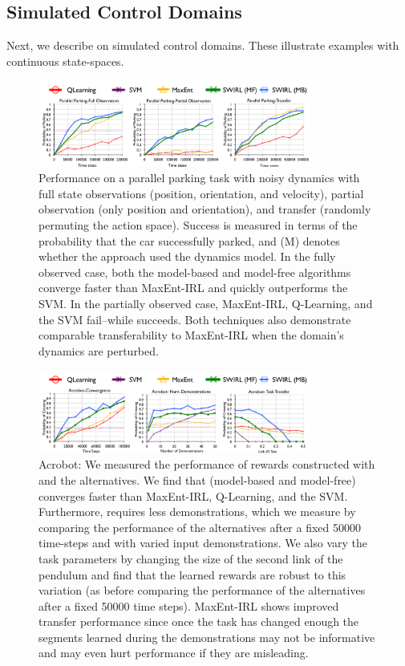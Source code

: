 \subsection{Simulated Control Domains}
Next, we describe \hirl on simulated control domains. These illustrate examples with continuous state-spaces.







\begin{figure}[t]
\centering
 \includegraphics[width=0.8\textwidth]{exp/rc-convergence-1.png}
 \caption{Performance on a parallel parking task with noisy dynamics with full state observations (position, orientation, and velocity), partial observation (only position and orientation), and transfer (randomly permuting the action space).
 Success is measured in terms of the probability that the car successfully parked, and (M) denotes whether the approach used the dynamics model.
 In the fully observed case, both the model-based and model-free \hirl algorithms converge faster than MaxEnt-IRL and quickly outperforms the SVM.
 In the partially observed case, MaxEnt-IRL, Q-Learning, and the SVM fail--while \hirl succeeds.
 Both techniques also demonstrate comparable transferability to MaxEnt-IRL when the domain's dynamics are perturbed.
\label{exp:rcsegmentation-res}}
\end{figure}



\begin{figure}[t]
\centering
 \includegraphics[width=0.8\textwidth]{exp/acr-convergence-1.png}
 \caption{Acrobot: We measured the performance of rewards constructed with \hirl and the alternatives. We find that \hirl (model-based and model-free) converges faster than MaxEnt-IRL, Q-Learning, and the SVM.
 Furthermore, \hirl requires less demonstrations, which we measure by comparing the performance of the alternatives after a fixed 50000 time-steps and with varied input demonstrations. 
 We also vary the task parameters by changing the size of the second link of the pendulum and find that the learned rewards are robust to this variation (as before comparing the performance of the alternatives after a fixed 50000 time steps). MaxEnt-IRL shows improved transfer performance since once the task has changed enough the segments learned during the demonstrations may not be informative and may even hurt performance if they are misleading. 
 \label{exp:acsegmentation-res2}}
\end{figure}

